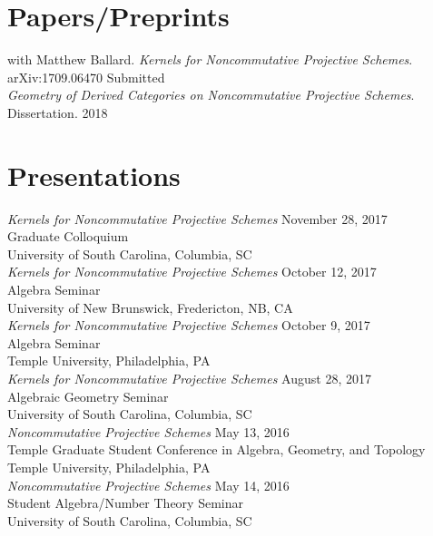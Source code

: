 \documentclass{article}
\begin{document}
  \section*{Papers/Preprints}
    with Matthew Ballard.  \textsl{Kernels for Noncommutative Projective Schemes}.
    arXiv:1709.06470 \hfill Submitted\\
    
    \noindent\textsl{Geometry of Derived Categories on Noncommutative Projective Schemes}. Dissertation. \hfill 2018\\

  \section*{Presentations}
  \textsl{Kernels for Noncommutative Projective Schemes} \hfill November 28, 2017\\
  Graduate Colloquium\\
  University of South Carolina, Columbia, SC\\
  
  \noindent \textsl{Kernels for Noncommutative Projective Schemes} \hfill October 12, 2017\\
  Algebra Seminar\\
  University of New Brunswick, Fredericton, NB, CA\\
  
  \noindent\textsl{Kernels for Noncommutative Projective Schemes} \hfill October 9, 2017\\
  Algebra Seminar\\
  Temple University, Philadelphia, PA\\
  
  \noindent\textsl{Kernels for Noncommutative Projective Schemes} \hfill August 28, 2017\\
  Algebraic Geometry Seminar\\
  University of South Carolina, Columbia, SC\\
  
  \noindent\textsl{Noncommutative Projective Schemes} \hfill May 13, 2016\\
  Temple Graduate Student Conference in Algebra, Geometry, and Topology\\
  Temple University, Philadelphia, PA\\

  \noindent\textsl{Noncommutative Projective Schemes} \hfill May 14, 2016\\
  Student Algebra/Number Theory Seminar\\
  University of South Carolina, Columbia, SC\\
\end{document}
